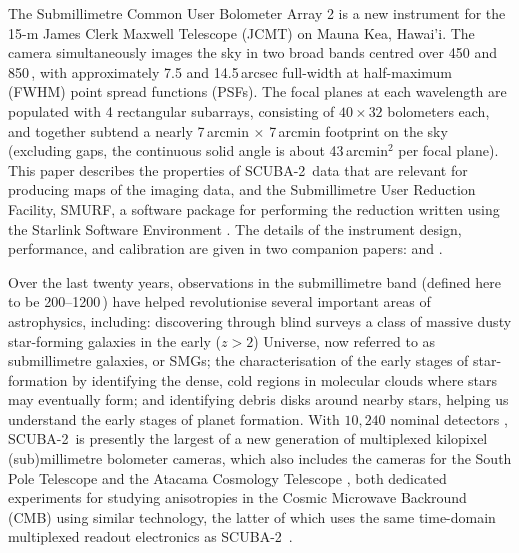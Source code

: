 \documentclass[useAMS,usenatbib,nofootinbib]{mn2e}
\newcommand{\scuba}{SCUBA-2}
\begin{document}
The Submillimetre Common User Bolometer Array 2
\citep[\scuba,][]{holland2012} is a new instrument for the 15-m James
Clerk Maxwell Telescope (JCMT) on Mauna Kea, Hawai'i. The camera
simultaneously images the sky in two broad bands centred over 450 and
850\,\micron, with approximately 7.5 and 14.5\,arcsec full-width at
half-maximum (FWHM) point spread functions (PSFs). The focal planes at
each wavelength are populated with 4 rectangular subarrays, consisting
of $40 \times 32$ bolometers each, and together subtend a nearly
7\,arcmin $\times$ 7\,arcmin footprint on the sky (excluding gaps, the
continuous solid angle is about 43\,arcmin$^{2}$ per focal plane).
This paper describes the properties of \scuba\ data that are relevant
for producing maps of the imaging data, and the Submillimetre User
Reduction Facility, SMURF, a software package for performing the
reduction written using the Starlink Software Environment
\citep{1993ASPC...52..229W,2009ASPC..411..418J}. The details of the
instrument design, performance, and calibration are given in two
companion papers: \citet{holland2012} and \citet{dempsey2012}.

Over the last twenty years, observations in the submillimetre band
(defined here to be 200--1200\,\micron) have helped revolutionise
several important areas of astrophysics, including: discovering
through blind surveys a class of massive dusty star-forming galaxies
in the early ($z>2$) Universe, now referred to as submillimetre
galaxies, or SMGs; the characterisation of the early stages of
star-formation by identifying the dense, cold regions in molecular
clouds where stars may eventually form; and identifying debris disks
around nearby stars, helping us understand the early stages of planet
formation.  With $10,240$ nominal detectors \citep[of which $\sim$69\%
work and are typically useful,][]{holland2012}, \scuba\ is presently
the largest of a new generation of multiplexed kilopixel
(sub)millimetre bolometer cameras, which also includes the cameras for
the South Pole Telescope \citep[SPT,][]{carlstrom2011} and the Atacama
Cosmology Telescope \citep[ACT,][]{swetz2011}, both dedicated
experiments for studying anisotropies in the Cosmic Microwave
Backround (CMB) using similar technology, the latter of which uses the
same time-domain multiplexed readout electronics as \scuba\
\citep{battistelli2008}.
\end{document}
